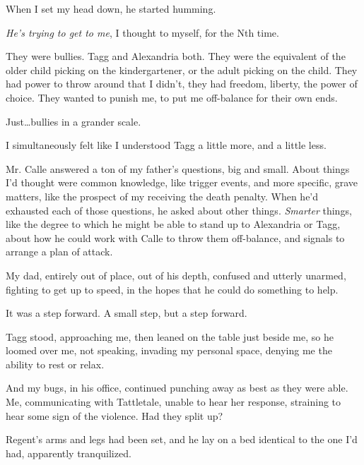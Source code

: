 When I set my head down, he started humming.



\emph{He's trying to get to me}, I thought to myself, for the Nth time.



They were bullies.  Tagg and Alexandria both.  They were the equivalent of the older child picking on the kindergartener, or the adult picking on the child.  They had power to throw around that I didn't, they had freedom, liberty, the power of choice.  They wanted to punish me, to put me off-balance for their own ends.



Just\ldots bullies in a grander scale.



I simultaneously felt like I understood Tagg a little more, and a little less.



Mr. Calle answered a ton of my father's questions, big and small.  About things I'd thought were common knowledge, like trigger events, and more specific, grave matters, like the prospect of my receiving the death penalty.  When he'd exhausted each of those questions, he asked about other things.  \emph{Smarter} things, like the degree to which he might be able to stand up to Alexandria or Tagg, about how he could work with Calle to throw them off-balance, and signals to arrange a plan of attack.



My dad, entirely out of place, out of his depth, confused and utterly unarmed, fighting to get up to speed, in the hopes that he could do something to help.



It was a step forward.  A small step, but a step forward.



Tagg stood, approaching me, then leaned on the table just beside me, so he loomed over me, not speaking, invading my personal space, denying me the ability to rest or relax.



And my bugs, in his office, continued punching away as best as they were able.  Me, communicating with Tattletale, unable to hear her response, straining to hear some sign of the violence.  Had they split up?



Regent's arms and legs had been set, and he lay on a bed identical to the one I'd had, apparently tranquilized.



